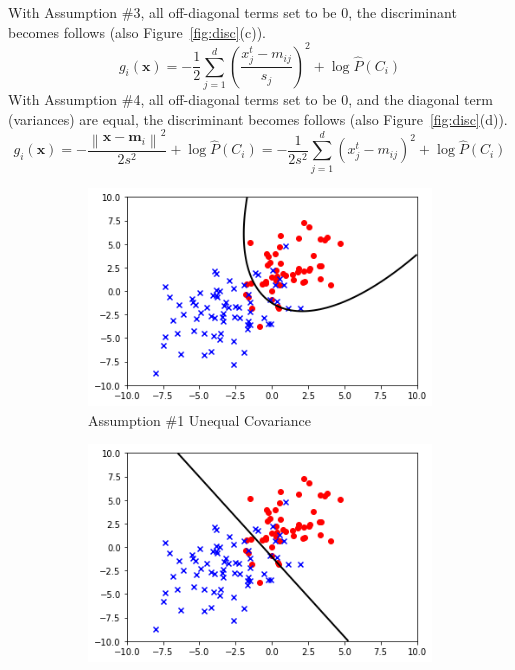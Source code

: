 \documentclass{article}
\begin{document}
\begin{enumerate}
    With Assumption \#3, all off-diagonal terms set to be 0, the discriminant becomes follows (also Figure~\ref{fig:disc}(c)).
    $$
    g_i(\boldsymbol{x})=-\frac{1}{2} \sum_{j=1}^d\left(\frac{x_j^t-m_{i j}}{s_j}\right)^2+\log \hat{P}\left(C_i\right)
    $$
    With Assumption \#4, all off-diagonal terms set to be 0, and the diagonal term (variances) are equal, the discriminant becomes follows (also Figure~\ref{fig:disc}(d)).
    $$
    g_i(\boldsymbol{x})=-\frac{\left\|\boldsymbol{x}-\boldsymbol{m}_i\right\|^2}{2 s^2}+\log \hat{P}\left(C_i\right)=-\frac{1}{2 s^2} \sum_{j=1}^d\left(x_j^t-m_{i j}\right)^2+\log \hat{P}\left(C_i\right)
    $$
    \begin{figure}[h!]
        \centering
        \begin{subfigure}[b]{0.45\textwidth}
            \centering
            \includegraphics[width=\textwidth]{images/assump1.png}
            \caption{Assumption \#1 Unequal Covariance}
            \label{fig:assump1}
        \end{subfigure}
        \hfill
        \begin{subfigure}[b]{0.45\textwidth}
            \centering
            \includegraphics[width=\textwidth]{images/assump2.png}

\end{subfigure}
\end{figure}
\end{enumerate}
\end{document}

